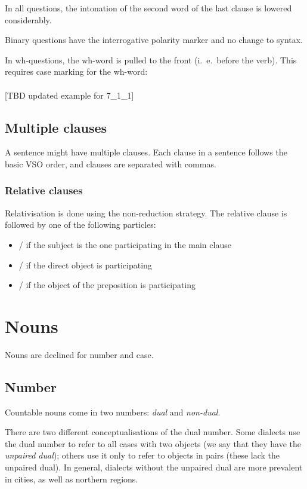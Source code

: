\documentclass{book}
\newcommand{\northo}[1]{\ortho{\textnedham{#1}}}
\begin{document}
In all questions, the intonation of the second word of the last clause is lowered considerably.

Binary questions have the interrogative polarity marker and no change to syntax.

In wh-questions, the wh-word is pulled to the front (i.~e.~before the verb). This requires case marking for the wh-word: \\
~\\
{}[TBD updated example for 7\_1\_1]

\section{Multiple clauses}

A sentence might have multiple clauses. Each clause in a sentence follows the basic VSO order, and clauses are separated with commas.

\subsection{Relative clauses}

Relativisation is done using the non-reduction strategy. The relative clause is followed by one of the following particles:

\begin{itemize}
  \item {} / \northo{ra} if the subject is the one participating in the main clause
  \item {} / \northo{ro} if the direct object is participating
  \item {} / \northo{rkn} if the object of the preposition  is participating
\end{itemize}

\chapter{Nouns}

Nouns are declined for number and case.

\section{Number}

Countable nouns come in two numbers: \emph{dual} and \emph{non-dual}.

There are two different conceptualisations of the dual number. Some dialects use the dual number to refer to all cases with two objects (we say that they have the \emph{unpaired dual}); others use it only to refer to objects in pairs (these lack the unpaired dual). In general, dialects without the unpaired dual are more prevalent in cities, as well as northern regions.
\end{document}
